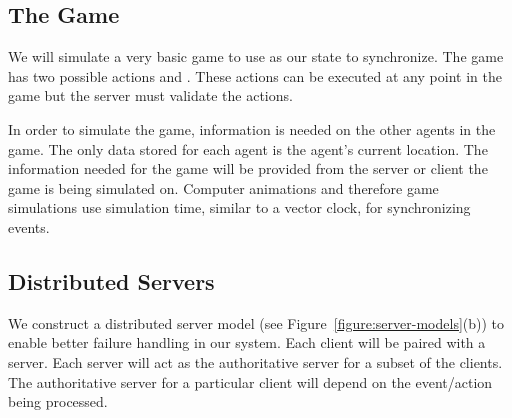 \subsection{The Game}

	We will simulate a very basic game to use as our state to synchronize. 
	The game has two possible actions \move{\agent}{\position} and . These actions can be executed at any point in the game but the server must validate the actions. 
	
	In order to simulate the game, information is needed on the other agents in the game. The only data stored for each agent is the agent's current location. The information needed for the game will be provided from the server or client the game is being simulated on. Computer animations and therefore game simulations use simulation time, similar to a vector clock, for synchronizing events.

\subsection{Distributed Servers}
\label{subsec:distributed-servers}

	We construct a distributed server model (see Figure~\ref{figure:server-models}(b)) to enable better failure handling in our system. Each client will be paired with a server. Each server will act as the authoritative server for a subset of the clients. The authoritative server for a particular client will depend on the event/action being processed. 
	
